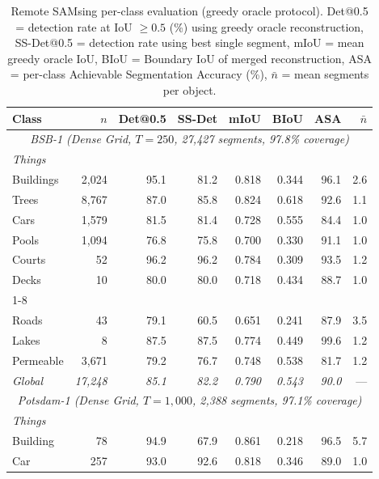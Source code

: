 \documentclass[review,11pt,authoryear]{elsarticle}
\begin{document}
\begin{table}[htbp]
\centering
\caption{Remote SAMsing per-class evaluation (greedy oracle protocol). Det@0.5 = detection rate at IoU $\geq 0.5$ (\%) using greedy oracle reconstruction, SS-Det@0.5 = detection rate using best single segment, mIoU = mean greedy oracle IoU, BIoU = Boundary IoU of merged reconstruction, ASA = per-class Achievable Segmentation Accuracy (\%), $\bar{n}$ = mean segments per object.}
\label{tab:perobject}
\scriptsize
\begin{tabular}{lrrrrrrr}
\toprule
Class & $n$ & Det@0.5 & SS-Det & mIoU & BIoU & ASA & $\bar{n}$ \\
\midrule
\multicolumn{8}{c}{\footnotesize\textit{BSB-1 (Dense Grid, $T = 250$, 27{,}427 segments, 97.8\% coverage)}} \\
\midrule
\multicolumn{8}{l}{\scriptsize\textit{Things}} \\
Buildings   & 2{,}024 & 95.1 & 81.2 & 0.818 & 0.344 & 96.1 & 2.6 \\
Trees       & 8{,}767 & 87.0 & 85.8 & 0.824 & 0.618 & 92.6 & 1.1 \\
Cars        & 1{,}579 & 81.5 & 81.4 & 0.728 & 0.555 & 84.4 & 1.0 \\
Pools       & 1{,}094 & 76.8 & 75.8 & 0.700 & 0.330 & 91.1 & 1.0 \\
Courts      &      52 & 96.2 & 96.2 & 0.784 & 0.309 & 93.5 & 1.2 \\
Decks       &      10 & 80.0 & 80.0 & 0.718 & 0.434 & 88.7 & 1.0 \\
\cmidrule{1-8}
\multicolumn{8}{l}{\scriptsize\textit{Stuff}} \\
Roads       &      43 & 79.1 & 60.5 & 0.651 & 0.241 & 87.9 & 3.5 \\
Lakes       &       8 & 87.5 & 87.5 & 0.774 & 0.449 & 99.6 & 1.2 \\
Permeable   & 3{,}671 & 79.2 & 76.7 & 0.748 & 0.538 & 81.7 & 1.2 \\
\textit{Global} & \textit{17{,}248} & \textit{85.1} & \textit{82.2} & \textit{0.790} & \textit{0.543} & \textit{90.0} & --- \\
\midrule
\multicolumn{8}{c}{\footnotesize\textit{Potsdam-1 (Dense Grid, $T = 1{,}000$, 2{,}388 segments, 97.1\% coverage)}} \\
\midrule
\multicolumn{8}{l}{\scriptsize\textit{Things}} \\
Building    &      78 & 94.9 & 67.9 & 0.861 & 0.218 & 96.5 & 5.7 \\
Car         &     257 & 93.0 & 92.6 & 0.818 & 0.346 & 89.0 & 1.0 \\

\end{tabular}
\end{table}
\end{document}
